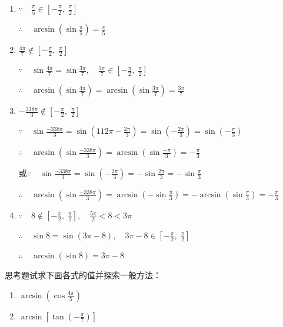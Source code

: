 \begin{solution}
\begin{enumerate}[(1)]
    \item $\because\quad \frac{\pi}{5}\in \left[-\frac{\pi}{2},\; \frac{\pi}{2}\right]$
    
    $\therefore\quad \arcsin\left(\sin\frac{\pi}{5}\right)=\frac{\pi}{5}$

\item $\frac{4\pi}{7}\notin \left[-\frac{\pi}{2},\; \frac{\pi}{2}\right]$

$\because\quad \sin\frac{4\pi}{7}=\sin\frac{3\pi}{7},\quad \frac{3\pi}{7}\in \left[-\frac{\pi}{2},\; \frac{\pi}{2}\right]$

$\therefore\quad \arcsin\left(\sin\frac{4\pi}{7}\right)=\arcsin\left(\sin\frac{3\pi}{7}\right)=\frac{3\pi}{7}$
\item $-\frac{338\pi}{3}\notin \left[-\frac{\pi}{2},\; \frac{\pi}{2}\right]$

$\because\quad \sin\frac{-338\pi}{3}=\sin\left(112\pi-\frac{2\pi}{3}\right)=\sin\left(-\frac{2\pi}{3}\right)=\sin\left(-\frac{\pi}{3}\right)  $

$\therefore\quad \arcsin\left(\sin\frac{-338\pi}{3}\right)=\arcsin\left(\sin\frac{-\pi}{3}\right)=-\frac{\pi}{3}$

或$\because\quad \sin\frac{-338\pi}{3}=\sin\left(-\frac{2\pi}{3}\right)=-\sin\frac{2\pi}{3}=-\sin\frac{\pi}{3}$

$\therefore\quad \arcsin\left(\sin\frac{-338\pi}{3}\right)=\arcsin\left(-\sin\frac{\pi}{3}\right)=-\arcsin\left(\sin\frac{\pi}{3}\right)=-\frac{\pi}{3}$

\item $\because\quad 8\notin \left[-\frac{\pi}{2},\; \frac{\pi}{2}\right],\quad \frac{5\pi}{2}<8<3\pi$

$\therefore\quad \sin 8=\sin(3\pi-8),\quad 3\pi-8\in\left[-\frac{\pi}{2},\; \frac{\pi}{2}\right]$

$\therefore\quad \arcsin(\sin 8)=3\pi-8$
\end{enumerate}
\end{solution}

\begin{thm}
    {思考题}试求下面各式的值并探索一般方法：
\begin{multicols}{2}
\begin{enumerate}[(1)]
    \item $\arcsin\left(\cos\frac{4\pi}{5}\right)$
    \item $\arcsin\left[\tan\left(-\frac{\pi}{7}\right)\right] $
\end{enumerate}
\end{multicols}
\end{thm}

